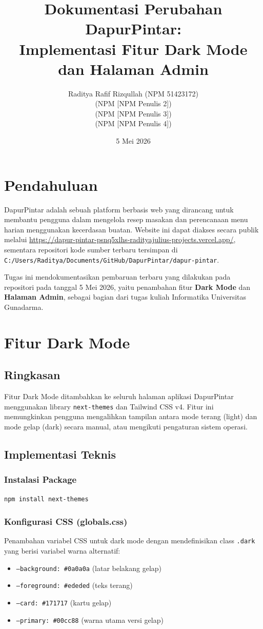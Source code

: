 \documentclass[12pt, a4paper]{article}
\title{\textbf{Dokumentasi Perubahan DapurPintar: \\ Implementasi Fitur Dark Mode dan Halaman Admin}}
\author{
  Raditya Rafif Rizqullah (NPM 51423172) \\
  [Nama Penulis 2] (NPM [NPM Penulis 2]) \\
  [Nama Penulis 3] (NPM [NPM Penulis 3]) \\
  [Nama Penulis 4] (NPM [NPM Penulis 4])
}
\date{5 Mei 2026}
\begin{document}
\maketitle
\thispagestyle{empty}
\newpage

\section{Pendahuluan}
DapurPintar adalah sebuah platform berbasis web yang dirancang untuk membantu pengguna dalam mengelola resep masakan dan perencanaan menu harian menggunakan kecerdasan buatan. Website ini dapat diakses secara publik melalui \url{https://dapur-pintar-psnq5xlhs-radityajulius-projects.vercel.app/}, sementara repositori kode sumber terbaru tersimpan di \texttt{C:/Users/Raditya/Documents/GitHub/DapurPintar/dapur-pintar}.

Tugas ini mendokumentasikan pembaruan terbaru yang dilakukan pada repositori pada tanggal 5 Mei 2026, yaitu penambahan fitur \textbf{Dark Mode} dan \textbf{Halaman Admin}, sebagai bagian dari tugas kuliah Informatika Universitas Gunadarma.

\section{Fitur Dark Mode}

\subsection{Ringkasan}
Fitur Dark Mode ditambahkan ke seluruh halaman aplikasi DapurPintar menggunakan library \texttt{next-themes} dan Tailwind CSS v4. Fitur ini memungkinkan pengguna mengalihkan tampilan antara mode terang (light) dan mode gelap (dark) secara manual, atau mengikuti pengaturan sistem operasi.

\subsection{Implementasi Teknis}

\subsubsection{Instalasi Package}
\begin{lstlisting}[language=bash]
npm install next-themes
\end{lstlisting}

\subsubsection{Konfigurasi CSS (globals.css)}
Penambahan variabel CSS untuk dark mode dengan mendefinisikan class \texttt{.dark} yang berisi variabel warna alternatif:
\begin{itemize}
  \item \texttt{--background: \#0a0a0a} (latar belakang gelap)
  \item \texttt{--foreground: \#ededed} (teks terang)
  \item \texttt{--card: \#171717} (kartu gelap)
  \item \texttt{--primary: \#00cc88} (warna utama versi gelap)
\end{itemize}
\end{document}
